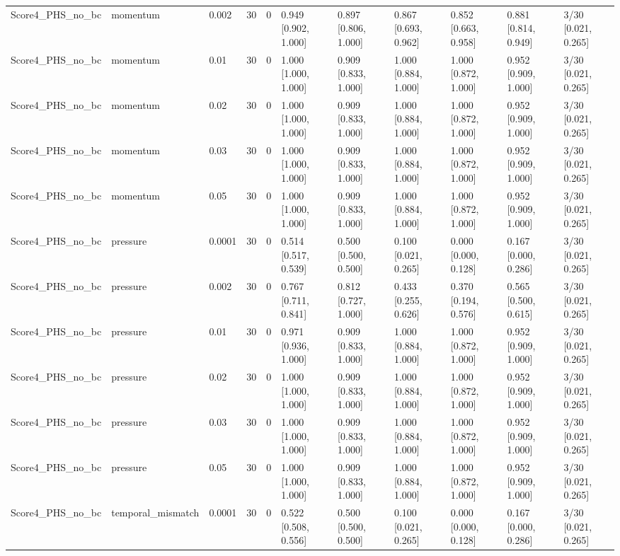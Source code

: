 \begin{longtable}{lllllllllll}
Score4\_PHS\_no\_bc & momentum & 0.002 & 30 & 0 & 0.949 [0.902, 1.000] & 0.897 [0.806, 1.000] & 0.867 [0.693, 0.962] & 0.852 [0.663, 0.958] & 0.881 [0.814, 0.949] & 3/30 [0.021, 0.265] \\
Score4\_PHS\_no\_bc & momentum & 0.01 & 30 & 0 & 1.000 [1.000, 1.000] & 0.909 [0.833, 1.000] & 1.000 [0.884, 1.000] & 1.000 [0.872, 1.000] & 0.952 [0.909, 1.000] & 3/30 [0.021, 0.265] \\
Score4\_PHS\_no\_bc & momentum & 0.02 & 30 & 0 & 1.000 [1.000, 1.000] & 0.909 [0.833, 1.000] & 1.000 [0.884, 1.000] & 1.000 [0.872, 1.000] & 0.952 [0.909, 1.000] & 3/30 [0.021, 0.265] \\
Score4\_PHS\_no\_bc & momentum & 0.03 & 30 & 0 & 1.000 [1.000, 1.000] & 0.909 [0.833, 1.000] & 1.000 [0.884, 1.000] & 1.000 [0.872, 1.000] & 0.952 [0.909, 1.000] & 3/30 [0.021, 0.265] \\
Score4\_PHS\_no\_bc & momentum & 0.05 & 30 & 0 & 1.000 [1.000, 1.000] & 0.909 [0.833, 1.000] & 1.000 [0.884, 1.000] & 1.000 [0.872, 1.000] & 0.952 [0.909, 1.000] & 3/30 [0.021, 0.265] \\
Score4\_PHS\_no\_bc & pressure & 0.0001 & 30 & 0 & 0.514 [0.517, 0.539] & 0.500 [0.500, 0.500] & 0.100 [0.021, 0.265] & 0.000 [0.000, 0.128] & 0.167 [0.000, 0.286] & 3/30 [0.021, 0.265] \\
Score4\_PHS\_no\_bc & pressure & 0.002 & 30 & 0 & 0.767 [0.711, 0.841] & 0.812 [0.727, 1.000] & 0.433 [0.255, 0.626] & 0.370 [0.194, 0.576] & 0.565 [0.500, 0.615] & 3/30 [0.021, 0.265] \\
Score4\_PHS\_no\_bc & pressure & 0.01 & 30 & 0 & 0.971 [0.936, 1.000] & 0.909 [0.833, 1.000] & 1.000 [0.884, 1.000] & 1.000 [0.872, 1.000] & 0.952 [0.909, 1.000] & 3/30 [0.021, 0.265] \\
Score4\_PHS\_no\_bc & pressure & 0.02 & 30 & 0 & 1.000 [1.000, 1.000] & 0.909 [0.833, 1.000] & 1.000 [0.884, 1.000] & 1.000 [0.872, 1.000] & 0.952 [0.909, 1.000] & 3/30 [0.021, 0.265] \\
Score4\_PHS\_no\_bc & pressure & 0.03 & 30 & 0 & 1.000 [1.000, 1.000] & 0.909 [0.833, 1.000] & 1.000 [0.884, 1.000] & 1.000 [0.872, 1.000] & 0.952 [0.909, 1.000] & 3/30 [0.021, 0.265] \\
Score4\_PHS\_no\_bc & pressure & 0.05 & 30 & 0 & 1.000 [1.000, 1.000] & 0.909 [0.833, 1.000] & 1.000 [0.884, 1.000] & 1.000 [0.872, 1.000] & 0.952 [0.909, 1.000] & 3/30 [0.021, 0.265] \\
Score4\_PHS\_no\_bc & temporal\_mismatch & 0.0001 & 30 & 0 & 0.522 [0.508, 0.556] & 0.500 [0.500, 0.500] & 0.100 [0.021, 0.265] & 0.000 [0.000, 0.128] & 0.167 [0.000, 0.286] & 3/30 [0.021, 0.265] \\

\end{longtable}
